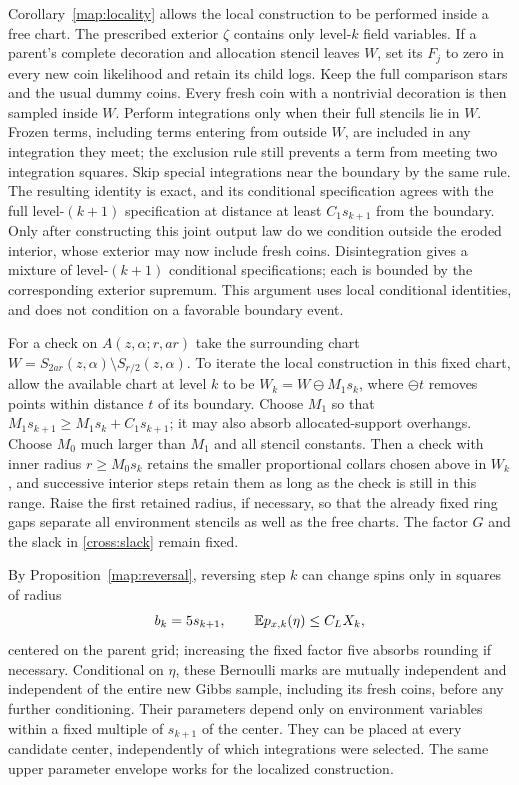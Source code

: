 Corollary~\ref{map:locality} allows the local construction to be performed
inside a free chart.  The prescribed exterior $\zeta$ contains only
level-$k$ field variables.  If a parent's complete decoration and
allocation stencil leaves $W$, set its $F_j$ to zero in every new coin
likelihood and retain its child logs.  Keep the full comparison stars
and the usual dummy coins.  Every fresh coin with a nontrivial
decoration is then sampled inside $W$.  Perform integrations only when
their full stencils lie in $W$.  Frozen terms, including terms entering
from outside $W$, are included in any
integration they meet; the exclusion rule still prevents a term from
meeting two integration squares.  Skip special integrations near the
boundary by the same rule.  The resulting identity is exact, and its
conditional specification agrees with the full level-$(k+1)$
specification at distance at least $C_1s_{k+1}$ from the boundary.
Only after constructing this joint output law do we condition outside
the eroded interior, whose exterior may now include fresh coins.
Disintegration gives a mixture of level-$(k+1)$ conditional
specifications; each is bounded by the corresponding exterior supremum.  This argument uses local conditional
identities, and does not condition on a favorable boundary event.

For a check on $A(z,\alpha;r,ar)$ take the surrounding chart
$W=S_{2ar}(z,\alpha)\setminus S_{r/2}(z,\alpha)$.  To iterate the
local construction in this fixed chart, allow the
available chart at level $k$ to be
$W_k=W\ominus M_1s_k$, where $\ominus t$ removes points within distance
$t$ of its boundary.  Choose $M_1$ so that
$M_1s_{k+1}\geq M_1s_k+C_1s_{k+1}$; it may also absorb allocated-support
overhangs.  Choose $M_0$ much larger than $M_1$ and all stencil constants.
Then a check with inner radius $r\geq M_0s_k$ retains the smaller
proportional collars chosen above in $W_k$, and successive interior steps
retain them as long as the check is still in this range.  Raise the first
retained radius, if necessary, so that the already fixed
ring gaps separate all environment stencils as well as the free charts.
The factor $G$ and the slack in \eqref{cross:slack} remain fixed.

By Proposition~\ref{map:reversal}, reversing step $k$ can change spins only in
squares of radius
\begin{equation}
 b_k=5s_{k+1},\qquad
 \mathbb E p_{x,k}(\eta)\leq C_LX_k,
 \label{cross:mark-bound}
\end{equation}
centered on the parent grid; increasing the fixed factor five absorbs
rounding if necessary.  Conditional on $\eta$, these Bernoulli marks
are mutually independent and independent of the entire new Gibbs
sample, including its fresh coins, before any further conditioning.
Their parameters depend only on environment variables within a fixed
multiple of $s_{k+1}$ of the center.  They can be placed at every candidate
center, independently of which integrations were selected.  The same
upper parameter envelope works for the localized construction.


